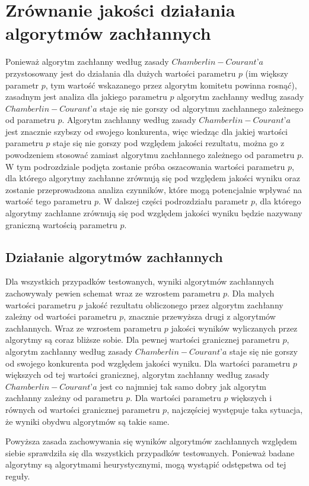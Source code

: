\documentclass[pdflatex,11pt]{../aghdoc_version2}
\begin{document}
\section{Zrównanie jakości działania algorytmów zachłannych}
Ponieważ algorytm zachłanny według zasady $Chamberlin-Courant’a$ przystosowany jest do działania dla dużych wartości parametru $p$ (im większy parametr $p$, tym wartość wskazanego przez algorytm komitetu powinna rosnąć), zasadnym jest analiza dla jakiego parametru $p$ algorytm zachłanny według zasady $Chamberlin-Courant’a$ staje się nie gorszy od algorytmu zachłannego zależnego od parametru $p$. Algorytm zachłanny według zasady $Chamberlin-Courant’a$ jest znacznie szybszy od swojego konkurenta, więc wiedząc dla jakiej wartości parametru $p$ staje się nie gorszy pod względem jakości rezultatu, można go z powodzeniem stosować zamiast algorytmu zachłannego zależnego od parametru $p$. W tym podrozdziale podjęta zostanie próba oszacowania wartości parametru $p$, dla którego algorytmy zachłanne zrównują się pod względem jakości wyniku oraz zostanie przeprowadzona analiza czynników, które mogą potencjalnie wpływać na wartość tego parametru $p$. W dalszej części podrozdziału parametr $p$, dla którego algorytmy zachłanne zrównują się pod względem jakości wyniku będzie nazywany graniczną wartością parametru $p$.
\subsection{Działanie algorytmów zachłannych}
Dla wszystkich przypadków testowanych, wyniki algorytmów zachłannych zachowywały pewien schemat wraz ze wzrostem parametru $p$. Dla małych wartości parametru $p$ jakość rezultatu obliczonego przez algorytm zachłanny zależny od wartości parametru $p$, znacznie przewyższa drugi z algorytmów zachłannych. Wraz ze wzrostem parametru $p$ jakości wyników wyliczanych przez algorytmy są coraz bliższe sobie. Dla pewnej wartości granicznej parametru $p$, algorytm zachłanny według zasady $Chamberlin-Courant’a$ staje się nie gorszy od swojego konkurenta pod względem jakości wyniku. Dla wartości parametru $p$ większych od tej wartości granicznej, algorytm zachłanny według zasady $Chamberlin-Courant’a$ jest co najmniej tak samo dobry jak algorytm zachłanny zależny od parametru $p$. Dla wartości parametru $p$ większych i równych od wartości granicznej parametru $p$, najczęściej występuje taka sytuacja, że wyniki obydwu algorytmów są takie same. 

Powyższa zasada zachowywania się wyników algorytmów zachłannych względem siebie sprawdziła się dla wszystkich przypadków testowanych. Ponieważ badane algorytmy są algorytmami heurystycznymi, mogą wystąpić odstępstwa od tej reguły. 
\end{document}
